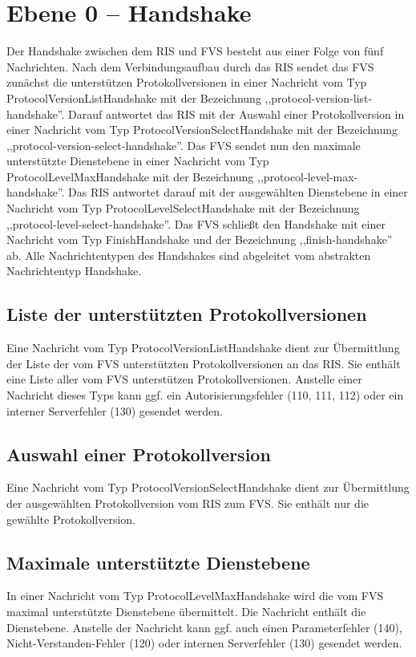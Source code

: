 \section{Ebene 0 -- Handshake}
Der Handshake zwischen dem RIS und FVS besteht aus einer Folge von fünf Nachrichten. Nach dem Verbindungsaufbau durch das RIS sendet das FVS zunächst die unterstützen Protokollversionen in einer Nachricht vom Typ ProtocolVersionListHandshake mit der Bezeichnung ,,protocol-version-list-handshake''. Darauf antwortet das RIS mit der Auswahl einer Protokollversion in einer Nachricht vom Typ ProtocolVersionSelectHandshake mit der Bezeichnung ,,protocol-version-select-handshake''. Das FVS sendet nun den maximale unterstützte Dienstebene in einer Nachricht vom Typ ProtocolLevelMaxHandshake mit der Bezeichnung ,,protocol-level-max-handshake''. Das RIS antwortet darauf mit der ausgewählten Dienstebene in einer Nachricht vom Typ ProtocolLevelSelectHandshake mit der Bezeichnung ,,protocol-level-select-handshake''. Das FVS schließt den Handshake mit einer Nachricht vom Typ FinishHandshake und der Bezeichnung ,,finish-handshake'' ab. Alle Nachrichtentypen des Handshakes sind abgeleitet vom abstrakten Nachrichtentyp Handshake.



\subsection{Liste der unterstützten Protokollversionen}
Eine Nachricht vom Typ ProtocolVersionListHandshake dient zur Übermittlung der Liste der vom FVS unterstützten Protokollversionen an das RIS. Sie enthält eine Liste aller vom FVS unterstützen Protokollversionen. Anstelle einer Nachricht dieses Typs kann ggf. ein Autorisierungsfehler (110, 111, 112) oder ein interner Serverfehler (130) gesendet werden.



\subsection{Auswahl einer Protokollversion}
Eine Nachricht vom Typ ProtocolVersionSelectHandshake dient zur Übermittlung der ausgewählten Protokollversion vom RIS zum FVS. Sie enthält nur die gewählte Protokollversion.



\subsection{Maximale unterstützte Dienstebene}
In einer Nachricht vom Typ ProtocolLevelMaxHandshake wird die vom FVS maximal unterstützte Dienstebene übermittelt. Die Nachricht enthält die Dienstebene. Anstelle der Nachricht kann ggf. auch einen Parameterfehler (140), Nicht-Verstanden-Fehler (120) oder internen Serverfehler (130) gesendet werden.

